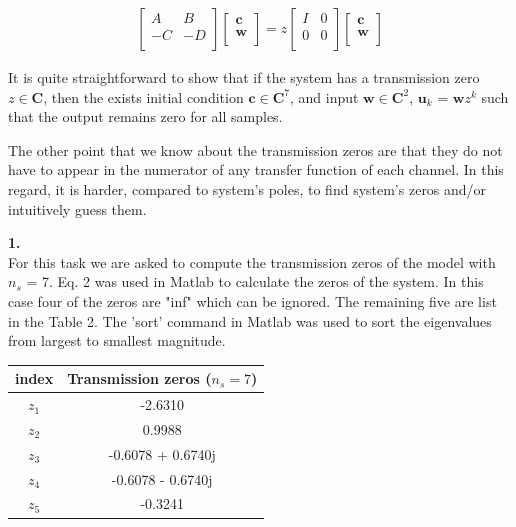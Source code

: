 \documentclass[paper=US leter, fontsize=11pt]{scrartcl}
\begin{document}
\begin{gather*}
 \begin{bmatrix}
A & B \\
-C & -D \\
\end{bmatrix} \tag{2}
\begin{bmatrix}
\textbf{c} \\
\textbf{w} \\
\end{bmatrix} = z
\begin{bmatrix}
I & 0\\
0 & 0 \\
\end{bmatrix} \begin{bmatrix}
\textbf{c} \\
\textbf{w} \\
\end{bmatrix}
\end{gather*}

It is quite straightforward to show that if the system has a transmission zero $z \in \textbf{C}$, then the exists initial condition $\textbf{c} \in \textbf{C}^{7}$, and input $\textbf{w} \in \textbf{C}^{2}$, $\textbf{u}_{k}$ = $\textbf{w}z^{k}$ such that the output remains zero for all samples.

The other point that we know about the transmission zeros are that they do not have to appear in the numerator of any transfer function of each channel. In this regard, it is harder, compared to system's poles, to find system's zeros and/or intuitively guess them.

\vspace{30pt}
\textbf{1.} \\
For this task we are asked to compute the transmission zeros of the model with $n_{s}$ = 7. Eq. 2 was used in Matlab to calculate the zeros of the system. In this case four of the zeros are "inf" which can be ignored. The remaining five are list in the Table 2. The 'sort' command in Matlab was used to sort the eigenvalues from largest to smallest magnitude.

\begin{center} \label{eigH100}
	\vspace{10pt}
	\begin{tabular}{ |c|c| } 
		\hline
		index & Transmission zeros ($n_{s}=7$) \\ 
		\hline
		$z_{1}$ & -2.6310 \\
		\hline
		$z_{2}$ & 0.9988   \\ 
		\hline
		$z_{3}$ & -0.6078 + 0.6740j \\
		\hline 
	    $z_{4}$ & -0.6078 - 0.6740j \\
		\hline
		$z_{5}$ & -0.3241 \\
		 \hline
	\end{tabular}
\end{center}
\end{document}
